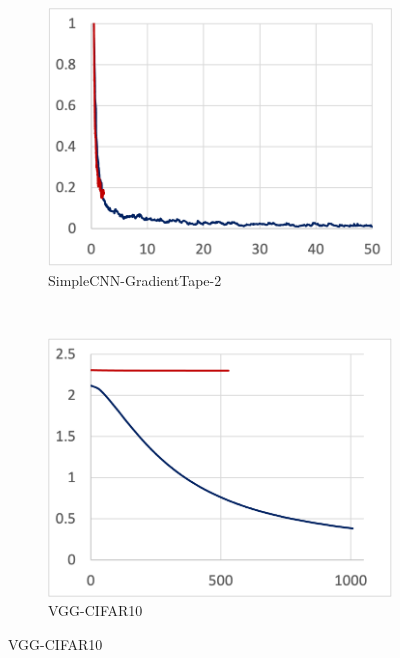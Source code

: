 \begin{figure}[!ht]
\begin{subfigure}[t]{.24\textwidth}
    \includegraphics[width=\textwidth]{tape-simple2}
    \caption{SimpleCNN-GradientTape-2}
  \end{subfigure}
  ~
  \begin{subfigure}[t]{.24\textwidth}
    \includegraphics[width=\textwidth]{keras-cifar}
    \caption{VGG-CIFAR10}
  \end{subfigure}


\end{figure}
